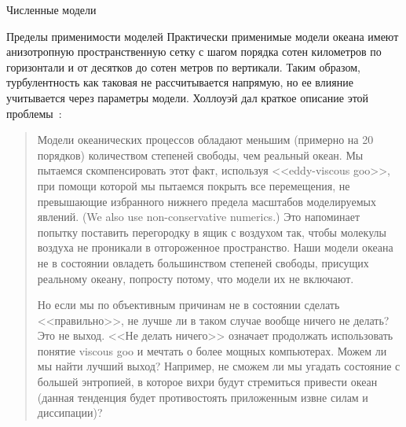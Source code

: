 \begin{chapter}{Численные модели}
\begin{section}{Пределы применимости моделей}
Практически применимые модели океана имеют анизотропную пространственную сетку 
с шагом порядка сотен километров по горизонтали и от десятков до сотен
метров по вертикали. Таким образом, турбулентность 
как таковая не рассчитывается напрямую, но ее влияние учитывается 
через параметры модели. Холлоуэй дал краткое описание этой
проблемы~\cite{Holloway:1994}:
%
\begin{quotation}
Модели океанических процессов обладают меньшим (примерно на 20 порядков)
количеством степеней свободы, чем реальный океан. Мы пытаемся скомпенсировать
этот факт, используя <<eddy-viscous goo>>, при помощи которой мы пытаемся
покрыть все перемещения, не превышающие избранного нижнего предела масштабов
моделируемых явлений. (We also use non-conservative numerics.) 
Это напоминает попытку поставить перегородку в ящик с воздухом так,
чтобы молекулы воздуха не проникали в отгороженное
пространство. Наши модели океана не в состоянии овладеть большинством
степеней свободы, присущих реальному океану, попросту потому, что модели
их не включают.
%

Но если мы по объективным причинам не в состоянии сделать <<правильно>>, 
не лучше ли в таком случае вообще ничего не делать? Это не выход. 
<<Не делать ничего>> означает продолжать использовать понятие viscous goo и 
мечтать о более мощных компьютерах. Можем ли мы найти лучший выход?
Например, не сможем ли мы угадать состояние с большей энтропией, в которое
вихри будут стремиться привести океан (данная тенденция будет противостоять
приложенным извне силам и диссипации)?
%
\end{quotation}


\end{section}
\end{chapter}
